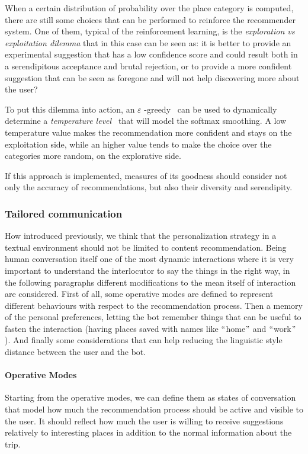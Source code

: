 When a certain distribution of probability over the place category is computed, there are still some choices that can be performed to reinforce the recommender system. One of them, typical of the reinforcement learning, is the \textit{exploration vs exploitation dilemma} that in this case can be seen as: it is better to provide an experimental suggestion that has a low confidence score and could result both in a serendipitous acceptance and brutal rejection, or to provide a more confident suggestion that can be seen as foregone and will not help discovering more about the user? 

To put this dilemma into action, an $ \varepsilon $ -greedy~\cite{tokic2010adaptive} can be used to dynamically determine a \textit{temperature level~\cite{hinton2015distilling}} that will model the softmax smoothing. A low temperature value makes the recommendation more confident and stays on the exploitation side, while an higher value tends to make the choice over the categories more random, on the explorative side.

If this approach is implemented, measures of its goodness should consider not only the accuracy of recommendations, but also their diversity and serendipity.

\subsubsection{Tailored communication}
\label{approachPersonalizationCommunication}

How introduced previously, we think that the personalization strategy in a textual environment should not be limited to content recommendation. Being human conversation itself one of the most dynamic interactions where it is very important to understand the interlocutor to say the things in the right way, in the following paragraphs different modifications to the mean itself of interaction are considered. First of all, some operative modes are defined to represent different behaviours with respect to the recommendation process. Then a memory of the personal preferences, letting the bot remember things that can be useful to fasten the interaction (having places saved with names like $``$home$"$  and $``$work$"$ ). And finally some considerations that can help reducing the linguistic style distance between the user and the bot.

\paragraph{Operative Modes}
Starting from the operative modes, we can define them as states of conversation that model how much the recommendation process should be active and visible to the user. It should reflect how much the user is willing to receive suggestions relatively to interesting places in addition to the normal information about the trip.

